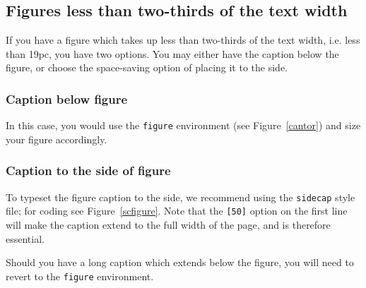 \subsection{Figures less than two-thirds of the text width}

If you have a figure which takes up less than two-thirds of the text width, i.e. less than 19pc, you have two options. You may either have the caption below the figure, or choose the space-saving option of placing it to the side.

\subsubsection{Caption below figure}

In this case, you would use the \verb"figure" environment (see Figure~\ref{cantor}) and size your figure accordingly.

\subsubsection{Caption to the side of figure}
\label{captiontoside}

To typeset the figure caption to the side, we recommend using the \verb"sidecap" style file; for coding see Figure~\ref{scfigure}. Note that the \verb"[50]" option on the first line will make the caption extend to the full width of the page, and is therefore essential.

Should you have a long caption which extends below the figure, you will need to revert to the \verb"figure" environment.
%

